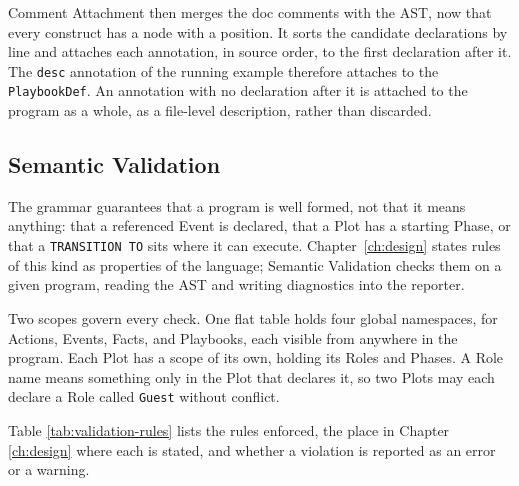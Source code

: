 Comment Attachment then merges the doc comments with the AST, now that every construct has a node with a position. It sorts the candidate declarations by line and attaches each annotation, in source order, to the first declaration after it. The \lstinline|desc| annotation of the running example therefore attaches to the \lstinline|PlaybookDef|. An annotation with no declaration after it is attached to the program as a whole, as a file-level description, rather than discarded.
 
 
\subsection{Semantic Validation}
\label{sec:semantic-validation}
 
The grammar guarantees that a program is well formed, not that it means anything: that a referenced Event is declared, that a Plot has a starting Phase, or that a \lstinline|TRANSITION TO| sits where it can execute. Chapter~\ref{ch:design} states rules of this kind as properties of the language; Semantic Validation checks them on a given program, reading the AST and writing diagnostics into the reporter.
 
Two scopes govern every check. One flat table holds four global namespaces, for Actions, Events, Facts, and Playbooks, each visible from anywhere in the program. Each Plot has a scope of its own, holding its Roles and Phases. A Role name means something only in the Plot that declares it, so two Plots may each declare a Role called \lstinline|Guest| without conflict.
 
Table \ref{tab:validation-rules} lists the rules enforced, the place in Chapter \ref{ch:design} where each is stated, and whether a violation is reported as an error or a warning.
 
